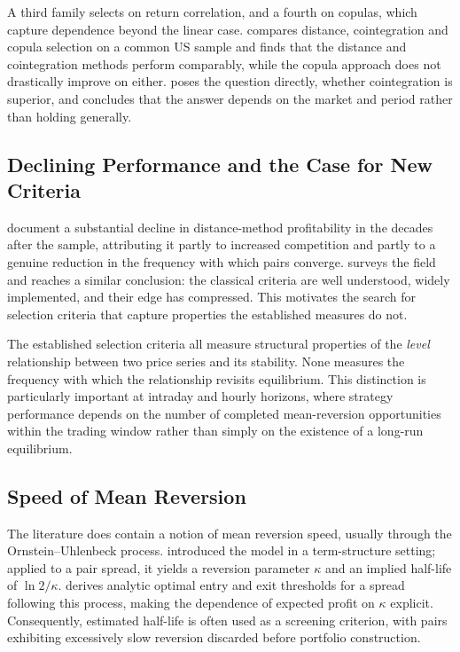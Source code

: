\documentclass[11pt,a4paper]{article}
\theoremstyle{definition}
\begin{document}
A third family selects on return correlation, and a fourth on copulas, which
capture dependence beyond the linear case. \citet{rad2016} compares distance,
cointegration and copula selection on a common US sample and finds that the
distance and cointegration methods perform comparably, while the copula approach
does not drastically improve on either. \citet{huck2015} poses the question directly, whether cointegration is superior, and concludes that the answer depends
on the market and period rather than holding generally.

\subsection{Declining Performance and the Case for New Criteria}

\citet{do2010} document a substantial decline in distance-method profitability
in the decades after the \citet{gatev2006} sample, attributing it partly to
increased competition and partly to a genuine reduction in the frequency with
which pairs converge. \citet{krauss2017} surveys the field and reaches a similar
conclusion: the classical criteria are well understood, widely implemented, and
their edge has compressed. This motivates the search for selection criteria that
capture properties the established measures do not.

The established selection criteria all measure structural properties of the
\emph{level} relationship between two price series and its stability. None
measures the frequency with which the relationship revisits equilibrium. This
distinction is particularly important at intraday and hourly horizons, where
strategy performance depends on the number of completed mean-reversion
opportunities within the trading window rather than simply on the existence of a
long-run equilibrium.

\subsection{Speed of Mean Reversion}

The literature does contain a notion of mean reversion speed, usually through the
Ornstein--Uhlenbeck process. \citet{vasicek1977} introduced the model in a
term-structure setting; applied to a pair spread, it yields a reversion parameter
$\kappa$ and an implied half-life of $\ln 2/\kappa$. \citet{bertram2010} derives
analytic optimal entry and exit thresholds for a spread following this process,
making the dependence of expected profit on $\kappa$ explicit. Consequently,
estimated half-life is often used as a screening criterion, with pairs exhibiting
excessively slow reversion discarded before portfolio construction.
\end{document}
